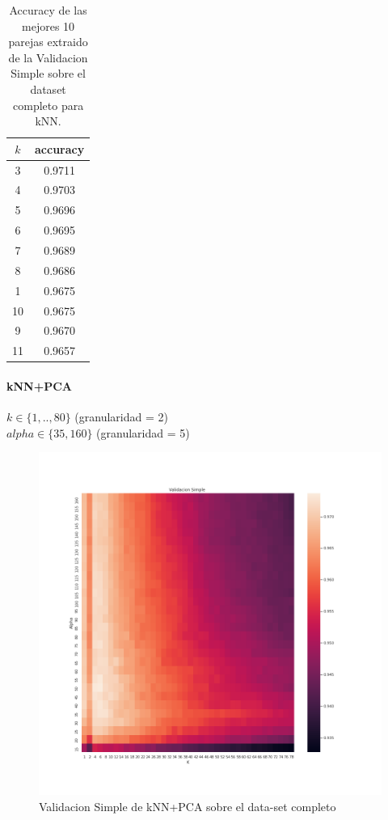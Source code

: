 \begin{table}[h!]
    \begin{center}
        \begin{tabular}{|c|c|}
        \hline
        \textbf{$k$} & \textbf{accuracy} \\
        \hline
        3 &  0.9711\\
        4 & 0.9703\\
        5 & 0.9696\\
        6 & 0.9695\\
        7 &  0.9689\\
        8 & 0.9686\\
        1 & 0.9675\\
        10 & 0.9675\\
        9 & 0.9670\\
        11 & 0.9657\\
        
        \hline
        \end{tabular}
        \caption{Accuracy de las mejores 10 parejas extraido de la Validacion Simple sobre el dataset completo para kNN.}
        \label{knn_valSimple_table}
    \end{center}
\end{table}

\paragraph{kNN+PCA}

\par

$ k \in \{1,..,80\}$ (granularidad = 2)\\$alpha \in \{  35, 160 \}$ (granularidad = 5)

\begin{figure}[H]
    \centering
    \includegraphics[width=12cm]{images/validacionSimple_datasetCompleto_knnpca_k80}%
    \qquad
    \caption{Validacion Simple de kNN+PCA sobre el data-set completo}
    \label{knnpca_valSimpleCompleto}%
\end{figure}



